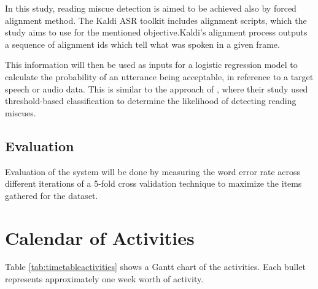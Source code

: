 In this study, reading miscue detection is aimed to be achieved also by forced alignment method. The Kaldi ASR toolkit includes alignment scripts, which the study aims to use for the mentioned objective.Kaldi's alignment process outputs a sequence of alignment ids which tell what was spoken in a given frame.

This information will then be used as inputs for a logistic regression model to calculate the probability of an utterance being acceptable, in reference to a target speech or audio data. This is similar to the approach of \citeauthor{pascual-2017} \citeyear{pascual-2017}, where their study used threshold-based classification to determine the likelihood of detecting reading miscues.

\subsection{Evaluation}

Evaluation of the system will be done by measuring the word error rate across different iterations of a 5-fold cross validation technique to maximize the items gathered for the dataset.

\section{Calendar of Activities}
%
%
\newcommand{\weekone}{\textbullet}
\newcommand{\weektwo}{\textbullet \textbullet}
\newcommand{\weekthree}{\textbullet \textbullet \textbullet}
\newcommand{\weekfour}{\textbullet \textbullet \textbullet \textbullet}

%
%
\begin{comment}
   \newcommand{\weekone}{$\star$}
   \newcommand{\weektwo}{$\star \star$}
   \newcommand{\weekthree}{$\star \star \star$}
   \newcommand{\weekfour}{$\star \star \star \star$ }
\end{comment}


Table \ref{tab:timetableactivities} shows a Gantt chart of the activities.  Each bullet represents approximately
one week worth of activity.

